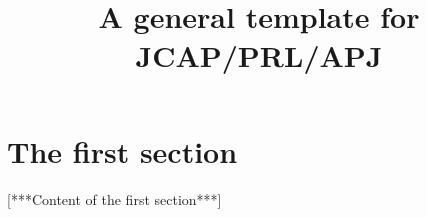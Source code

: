 % 

% 
% 









\title{A general template for JCAP/PRL/APJ}


\somebody



\mktt


\section{The first section}\label{sec:}

[***Content of the first section***]










